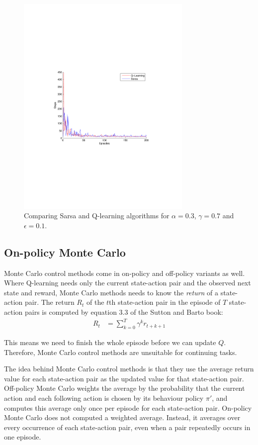 \documentclass[a4paper,11pt]{article}
\begin{document}
\begin{figure}[t!]
  \centering
    \includegraphics[trim=4cm 8.5cm 4cm 8.5cm,clip,width=0.75\textwidth]{figures/sarsaQcomp03.pdf}
    \caption{Comparing Sarsa and Q-learning algorithms for $\alpha = 0.3$, $\gamma = 0.7$ and $\epsilon = 0.1$.}
    \label{sarsaQcomp03}
\end{figure}


\subsection*{On-policy Monte Carlo}
Monte Carlo control methods come in on-policy and off-policy variants as well.  Where Q-learning needs only the current state-action pair and the observed next state and reward, Monte Carlo methods needs to know the \emph{return} of a state-action pair.  The return $R_t$ of the $t$th state-action pair in the episode of $T$ state-action pairs is computed by equation 3.3 of the Sutton and Barto book:
\begin{align*}
  R_t &= \sum^T_{k=0} \gamma^k r_{t + k + 1}
\end{align*}

This means we need to finish the whole episode before we can update $Q$. Therefore, Monte Carlo control methods are unsuitable for continuing tasks.

The idea behind Monte Carlo control methods is that they use the average return value for each state-action pair as the updated value for that state-action pair.  Off-policy Monte Carlo weights the average by the probability that the current action and each following action is chosen by its behaviour policy $\pi'$, and computes this average only once per episode for each state-action pair.  On-policy Monte Carlo does not computed a weighted average.  Instead, it averages over every occurrence of each state-action pair, even when a pair repeatedly occurs in one episode.
\end{document}
